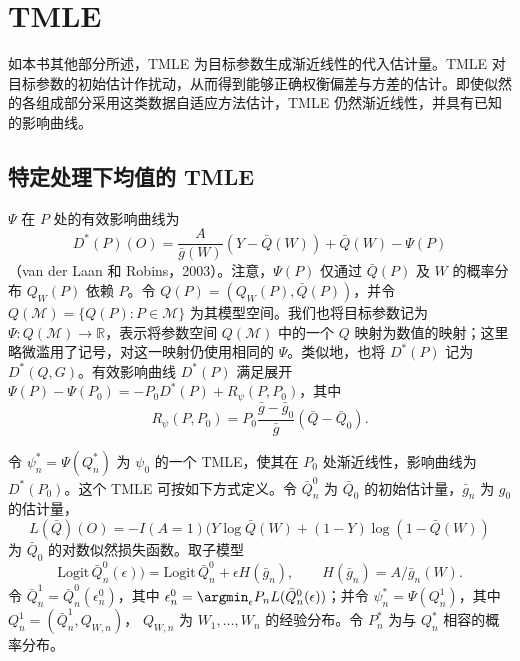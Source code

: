 \section{TMLE}

如本书其他部分所述，TMLE 为目标参数生成渐近线性的代入估计量。TMLE 对目标参数的初始估计作扰动，从而得到能够正确权衡偏差与方差的估计。即使似然的各组成部分采用这类数据自适应方法估计，TMLE 仍然渐近线性，并具有已知的影响曲线。

\subsection{特定处理下均值的 TMLE}

$\Psi$ 在 $P$ 处的有效影响曲线为
\[
 D^*(P)(O)=\frac{A}{\bar g(W)}(Y-\bar Q(W))
 +\bar Q(W)-\Psi(P)
\]
（van der Laan 和 Robins，2003）。注意，$\Psi(P)$ 仅通过 $\bar Q(P)$ 及 $W$ 的概率分布 $Q_W(P)$ 依赖 $P$。令 $Q(P)=(Q_W(P),\bar Q(P))$，并令
$Q(\mathcal M)=\{Q(P):P\in\mathcal M\}$ 为其模型空间。我们也将目标参数记为 $\Psi:Q(\mathcal M)\to\mathbb R$，表示将参数空间 $Q(\mathcal M)$ 中的一个 $Q$ 映射为数值的映射；这里略微滥用了记号，对这一映射仍使用相同的 $\Psi$。类似地，也将 $D^*(P)$ 记为 $D^*(Q,G)$。有效影响曲线 $D^*(P)$ 满足展开
$\Psi(P)-\Psi(P_0)=-P_0D^*(P)+R_\psi(P,P_0)$，其中
\[
 R_\psi(P,P_0)=P_0\frac{\bar g-\bar g_0}{\bar g}
 (\bar Q-\bar Q_0).
\]

令 $\psi_n^*=\Psi(Q_n^*)$ 为 $\psi_0$ 的一个 TMLE，使其在 $P_0$ 处渐近线性，影响曲线为 $D^*(P_0)$。这个 TMLE 可按如下方式定义。令 $\bar Q_n^0$ 为 $\bar Q_0$ 的初始估计量，$\bar g_n$ 为 $g_0$ 的估计量，
\[
 L(\bar Q)(O)=-I(A=1)(Y\log\bar Q(W)
 +(1-Y)\log(1-\bar Q(W))
\]
为 $\bar Q_0$ 的对数似然损失函数。取子模型
\[
 \mathrm{Logit}\,\bar Q_n^0(\epsilon))
 =\mathrm{Logit}\,\bar Q_n^0+\epsilon H(\bar g_n),
 \qquad H(\bar g_n)=A/\bar g_n(W).
\]
令 $\bar Q_n^1=\bar Q_n^0(\epsilon_n^0)$，其中
$\epsilon_n^0=\argmin_\epsilon P_nL(\bar Q_n^0(\epsilon))$；并令
$\psi_n^*=\Psi(Q_n^1)$，其中 $Q_n^1=(\bar Q_n^1,Q_{W,n})$，
$Q_{W,n}$ 为 $W_1,\ldots,W_n$ 的经验分布。令 $P_n^*$ 为与 $Q_n^*$ 相容的概率分布。
